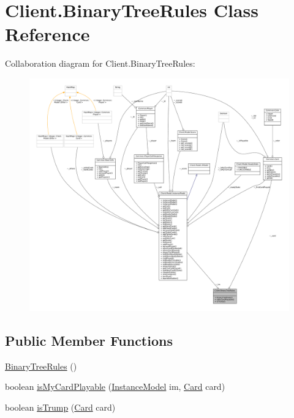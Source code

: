 \hypertarget{classClient_1_1BinaryTreeRules}{}\section{Client.\+Binary\+Tree\+Rules Class Reference}
\label{classClient_1_1BinaryTreeRules}


Collaboration diagram for Client.\+Binary\+Tree\+Rules\+:
\nopagebreak
\begin{figure}[H]
\begin{center}
\leavevmode
\includegraphics[width=350pt]{classClient_1_1BinaryTreeRules__coll__graph}
\end{center}
\end{figure}
\subsection*{Public Member Functions}
\begin{DoxyCompactItemize}
\item 
\mbox{\hyperlink{classClient_1_1BinaryTreeRules_ab6c1e397f8796077e1c7b4f0b830c2bc}{Binary\+Tree\+Rules}} ()
\item 
boolean \mbox{\hyperlink{classClient_1_1BinaryTreeRules_ae1e5dff7d60911140f0dace0b1d3e346}{is\+My\+Card\+Playable}} (\mbox{\hyperlink{classClient_1_1Model_1_1InstanceModel}{Instance\+Model}} im, \mbox{\hyperlink{classCommon_1_1Card}{Card}} card)
\item 
boolean \mbox{\hyperlink{classClient_1_1BinaryTreeRules_a27149c7f4a1039d0baf2d5f19f56b6ce}{is\+Trump}} (\mbox{\hyperlink{classCommon_1_1Card}{Card}} card)
\end{DoxyCompactItemize}


